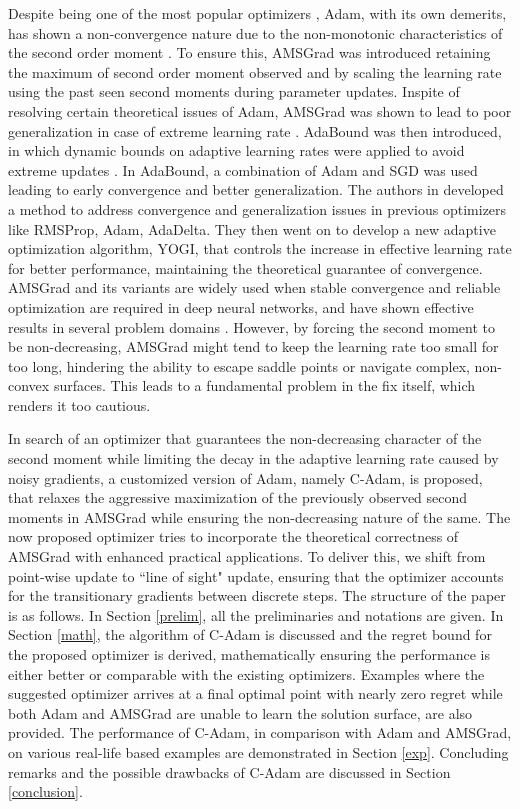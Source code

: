 \documentclass[12pt]{article}
\begin{document}
Despite being one of the most popular optimizers \cite{sreckovic2025your, kalra2021applying}, Adam, with its own demerits, has shown a non-convergence nature due to the non-monotonic characteristics of the second order moment \cite{ReddiKaleKumar2019}. To ensure this, AMSGrad was introduced \cite{ReddiKaleKumar2019} retaining the maximum of second order moment observed and by scaling the learning rate using the past seen second moments during parameter updates. Inspite of resolving certain theoretical issues of Adam, AMSGrad was shown to lead to poor generalization in case of extreme learning rate \cite{luo2019adaptive}. AdaBound was then introduced, in which dynamic bounds on adaptive learning rates were applied to avoid extreme updates \cite{luo2019adaptive}. In AdaBound, a combination of Adam and SGD was used leading to early convergence and better generalization. The authors in \cite{zaheer2018adaptive} developed a method to address convergence and generalization issues in previous optimizers like RMSProp, Adam, AdaDelta. They then went on to develop a new adaptive optimization algorithm, YOGI, that controls the increase in effective learning rate for better performance, maintaining the theoretical guarantee of convergence. AMSGrad and its variants are widely used when stable convergence and reliable optimization are required in deep neural networks, and have shown effective results in several problem domains \cite{svelebamultilayered,mohammed2019new}. However, by forcing the second moment to be non-decreasing, AMSGrad might tend to keep the learning rate too small for too long, hindering the ability to escape saddle points or navigate complex, non-convex surfaces. This leads to a fundamental problem in the fix itself, which renders it too cautious.

In search of an optimizer that guarantees the non-decreasing character of the second moment while limiting the decay in the adaptive learning rate caused by noisy gradients, a customized version of Adam, namely C-Adam, is proposed, that relaxes the aggressive maximization of the previously observed second moments in AMSGrad while ensuring the non-decreasing nature of the same. The now proposed optimizer tries to incorporate the theoretical correctness of AMSGrad with enhanced practical applications. To deliver this, we shift from point-wise update to ``line of sight" update, ensuring that the optimizer accounts for the transitionary gradients between discrete steps. The structure of the paper is as follows. In Section \ref{prelim}, all the preliminaries and notations are given. In Section \ref{math}, the algorithm of C-Adam is discussed and the regret bound for the proposed optimizer is derived, mathematically ensuring the performance is either better or comparable with the existing optimizers. Examples where the suggested optimizer arrives at a final optimal point with nearly zero regret while both Adam and AMSGrad are unable to learn the solution surface, are also provided. The performance of C-Adam, in comparison with Adam and AMSGrad, on various real-life based examples are demonstrated in Section \ref{exp}. Concluding remarks and the possible drawbacks of C-Adam are discussed in Section \ref{conclusion}. 
\end{document}
